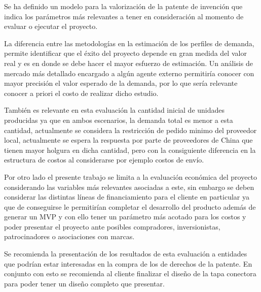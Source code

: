 Se ha definido un modelo para la valorización de la patente de invención que indica los parámetros más relevantes a tener en consideración al momento de evaluar o ejecutar el proyecto.

La diferencia entre las metodologías en la estimación de los perfiles de demanda, permite identificar que el éxito del proyecto depende en gran medida del valor real y es en donde se debe hacer el mayor esfuerzo de estimación. Un análisis de mercado más detallado encargado a algún agente externo permitiría conocer con mayor precisión el valor esperado de la demanda, por lo que sería relevante conocer a priori el costo de realizar dicho estudio.

También es relevante en esta evaluación la cantidad inicial de unidades producidas ya que en ambos escenarios, la demanda total es menor a esta cantidad, actualmente se considera la restricción de pedido minimo del proveedor local, actualmente se espera la respuesta por parte de proveedores de China que tienen mayor holgura en dicha cantidad, pero con la consiguiente diferencia en la estructura de costos al considerarse por ejemplo costos de envío.


Por otro lado el presente trabajo se limita a la evaluación económica del proyecto considerando las variables más relevantes asociadas a este, sin embargo se deben considerar las distintas líneas de financiamiento para el cliente en particular ya que de conseguirse le permitirían completar el desarrollo del producto además de generar un MVP y con ello tener un parámetro más acotado para los costos y poder presentar el proyecto ante posibles compradores, inversionistas, patrocinadores o asociaciones con marcas.

Se recomienda la presentación de los resultados de esta evaluación a entidades que podrían estar interesadas en la compra de los de derechos de la patente. En conjunto con esto se recomienda al cliente finalizar el diseño de la tapa conectora para poder tener un diseño completo que presentar.

